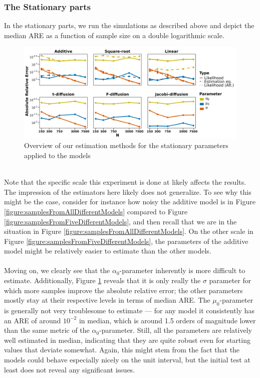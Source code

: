 \subsubsection{The Stationary parts}
In the stationary parts, we run the simulations as described above and depict the median ARE as a function of sample size on a double logarithmic scale.
\begin{figure}[h]
    \begin{center}
    \includegraphics[scale = .1]{figures/parameter_precision_stationary.jpeg}
    \caption{Overview of our estimation methods for the stationary parameters applied to the models}
    \label{figure:overviewOfEstimatorsStationary}
    \end{center}
\end{figure}\\
Note that the specific scale this experiment is done at likely affects the results. The impression of the estimators here likely does not generalize. To see why this might be the case, consider for instance how noisy the additive model is in Figure \ref{figure:samplesFromAllDifferentModels} compared to Figure \ref{figure:samplesFromFiveDifferentModels}, and then recall that we are in the situation in Figure \ref{figure:samplesFromAllDifferentModels}. On the other scale in Figure \ref{figure:samplesFromFiveDifferentModels}, the parameters of the additive model might be relatively easier to estimate than the other models.\\\\
Moving on, we clearly see that the $\alpha_0$-parameter inherently is more difficult to estimate. Additionally, Figure \ref{figure:overviewOfEstimatorsStationary} reveals that it is only really the $\sigma$ parameter for which more samples improve the absolute relative error; the other parameters mostly stay at their respective levels in terms of median ARE. The $\mu_0$-parameter is generally not very troublesome to estimate — for any model it consistently has an ARE of around $10^{-2}$ in median, which is around 1.5 orders of magnitude lower than the same metric of the $\alpha_0$-parameter. Still, all the parameters are relatively well estimated in median, indicating that they are quite robust even for starting values that deviate somewhat. Again, this might stem from the fact that the models could behave especially nicely on the unit interval, but the initial test at least does not reveal any significant issues.

